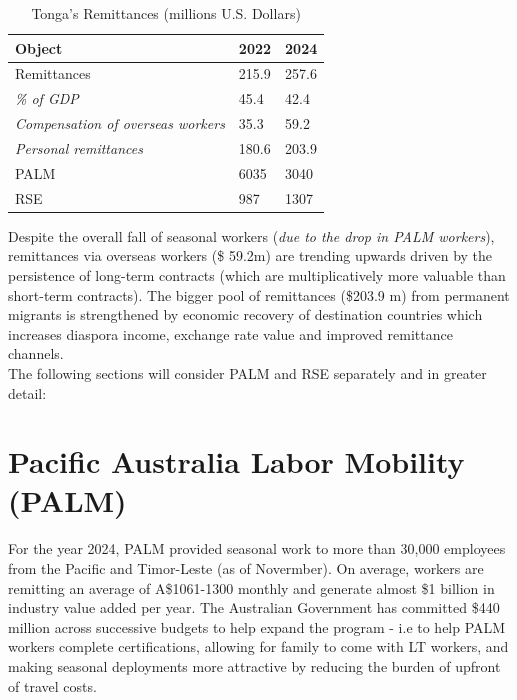 \documentclass[9pt,a4paper,twocolumn,twoside]{tau-class/tau}
\begin{document}
    	        \begin{table}[H]
            \centering
            \caption{Tonga's Remittances (millions U.S. Dollars)}
            \label{tab:table}
            \begin{tabular}{lll}
                \toprule
                \textbf{Object} & \textbf{2022} & \textbf{2024}
                \\
                \midrule
                Remittances & 215.9 & 257.6 \\
                \hspace{5mm} \textit{\% of GDP} & 45.4 & 42.4 \\
                \hspace{5mm} \textit{Compensation of overseas workers} & 35.3 & 59.2 \\
               \hspace{5mm}  \textit{Personal remittances} & 180.6 & 203.9 \\
               \cline{2-3}
               PALM & 6035 & 3040 \\
               RSE & 987 & 1307 \\
                \bottomrule     
            \end{tabular}
			
			
        \end{table}

        Despite the overall fall of seasonal workers (\textit{due to the drop in PALM workers}), remittances via overseas workers (\$ 59.2m) are trending upwards driven by the persistence of long-term contracts (which are multiplicatively more valuable than short-term contracts). The bigger pool of remittances (\$203.9 m) from permanent migrants is strengthened by economic recovery of destination countries which increases diaspora income, exchange rate value and improved remittance channels. \\
        The following sections will consider PALM and RSE separately and in greater detail:

        
\section{Pacific Australia Labor Mobility (PALM)}

	\begin{tauenv}[frametitle=Background]
  For the year 2024, PALM provided seasonal work to more than 30,000 employees from the Pacific and Timor-Leste (as of Novermber). On average, workers are remitting an average of A\$1061-1300 monthly and generate almost \$1 billion in industry value added per year. The Australian Government has committed \$440 million across successive budgets to help expand the program -  i.e to help PALM workers complete certifications, allowing for family to come with LT workers, and making seasonal deployments more attractive by reducing the burden of upfront of travel costs.
                 	\end{tauenv}
\end{document}
